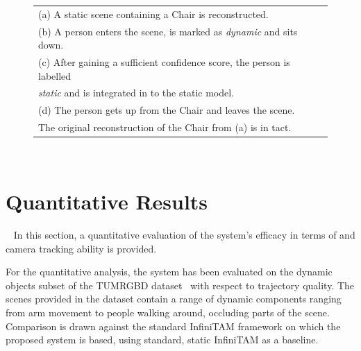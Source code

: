 \begin{figure}[!htbp]
{\begin{tabular}[t]{@{}l@{}}
      (a) A static scene containing a Chair is reconstructed.\\
      (b) A person enters the scene, is marked as \textit{dynamic} and sits down.\\
      (c) After gaining a sufficient confidence score, the person is labelled\\
      \textit{static} and is integrated in to the static model.\\
      (d) The person gets up from the Chair and leaves the scene.\\ The original
      reconstruction of the Chair from (a) is in tact.
    \end{tabular}
  }
~\label{figure:moseg_qualitative_chair}
\end{figure}

\section{Quantitative Results}
~\label{sec:moseg_quantitative}
In this section, a quantitative evaluation of the system's efficacy in terms of
and camera tracking ability is provided.

For the quantitative analysis, the system has been evaluated on the dynamic
objects subset of the TUM\footnotemark RGBD dataset~\cite{Sturm2012} with respect to
trajectory quality. The scenes provided in the dataset contain a range of
dynamic components ranging from arm movement to people walking around, occluding
parts of the scene. Comparison is drawn against the standard InfiniTAM framework
on which the proposed system is based, using standard, static InfiniTAM as a
baseline.
~

